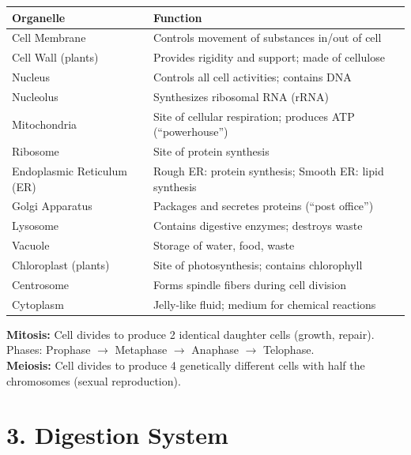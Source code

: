 \documentclass[12pt]{article}
\newcommand{\hcell}[1]{\textbf{\color{white}#1}}
\begin{document}
\begin{center}
\renewcommand{\arraystretch}{1.4}
\begin{tabular}{|C{4.5cm}|C{8cm}|}
\hline
{}\hcell{Organelle} & \hcell{Function} \\
\hline
Cell Membrane & Controls movement of substances in/out of cell \\
 Cell Wall (plants) & Provides rigidity and support; made of cellulose \\
Nucleus & Controls all cell activities; contains DNA \\
 Nucleolus & Synthesizes ribosomal RNA (rRNA) \\
Mitochondria & Site of cellular respiration; produces ATP (``powerhouse'') \\
 Ribosome & Site of protein synthesis \\
Endoplasmic Reticulum (ER) & Rough ER: protein synthesis; Smooth ER: lipid synthesis \\
 Golgi Apparatus & Packages and secretes proteins (``post office'') \\
Lysosome & Contains digestive enzymes; destroys waste \\
 Vacuole & Storage of water, food, waste \\
Chloroplast (plants) & Site of photosynthesis; contains chlorophyll \\
 Centrosome & Forms spindle fibers during cell division \\
Cytoplasm & Jelly-like fluid; medium for chemical reactions \\
\hline
\end{tabular}
\end{center}

\begin{thmbox}
\textbf{Mitosis:} Cell divides to produce 2 identical daughter cells (growth, repair). Phases: Prophase $\to$ Metaphase $\to$ Anaphase $\to$ Telophase.\\[4pt]
\textbf{Meiosis:} Cell divides to produce 4 genetically different cells with half the chromosomes (sexual reproduction).
\end{thmbox}

\section{3. Digestion System}
\end{document}
